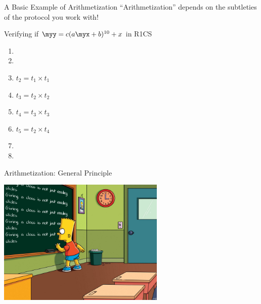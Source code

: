 \documentclass[presentation,aspectratio=1610]{beamer}
\begin{document}
\begin{frame}{A Basic Example of Arithmetization}
  ``Arithmetization'' depends on the subtleties of the \alert{protocol} you work with!

  \pause
  
  \begin{exampleblock}{Verifying if $\myy = c(a \myx + b)^{10}+x$ in R1CS}
    \begin{multicols}{2}
      \begin{enumerate}
      \item {}
      \item {}
      \item $t_{2} = t_{1} \times t_{1}$
      \item $t_{3} = t_{2} \times t_{2}$
      \item $t_{4} = t_{3} \times t_{3}$
      \item $t_{5} = t_{2} \times t_{4}$
      \item {}
      \item {}
      \end{enumerate}
    \end{multicols}

  \end{exampleblock}
\end{frame}


\begin{frame}{Arithmetization: General Principle}
  \begin{center}
    \includegraphics[width=8cm]{./figures/simpsons}
  \end{center}
\end{frame}
\end{document}
